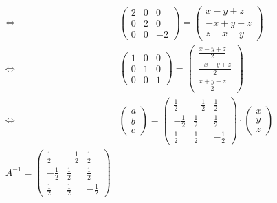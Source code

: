 \documentclass[notitlepage]{math}
\begin{document}
\begin{align*}
        \Longleftrightarrow &
        \begin{pmatrix}
            2 & 0 & 0 \\
            0 & 2 & 0 \\
            0 & 0  & -2
        \end{pmatrix} =
        \begin{pmatrix}
            x - y + z \\
            -x + y + z \\
            z - x - y
        \end{pmatrix} \\
        \Longleftrightarrow &
        \begin{pmatrix}
            1 & 0 & 0 \\
            0 & 1 & 0 \\
            0 & 0  & 1
        \end{pmatrix} = 
        \begin{pmatrix}
            \frac{x - y + z}{2} \\
            \frac{-x + y + z}{2} \\
            \frac{x + y - z}{2}
        \end{pmatrix} \\
        \Longleftrightarrow &
        \begin{pmatrix}
            a \\
            b \\
            c
        \end{pmatrix} =
        \begin{pmatrix}
            \frac{1}{2} & -\frac{1}{2} & \frac{1}{2} \\ 
            -\frac{1}{2} & \frac{1}{2} & \frac{1}{2} \\
            \frac{1}{2} & \frac{1}{2} & -\frac{1}{2}
        \end{pmatrix} \cdot
        \begin{pmatrix}
            x \\
            y \\
            z
        \end{pmatrix} \\
        A ^{-1} = \begin{pmatrix}
            \frac{1}{2} & -\frac{1}{2} & \frac{1}{2} \\ 
            -\frac{1}{2} & \frac{1}{2} & \frac{1}{2} \\
            \frac{1}{2} & \frac{1}{2} & -\frac{1}{2}
        \end{pmatrix}
\end{align*}
\end{document}
